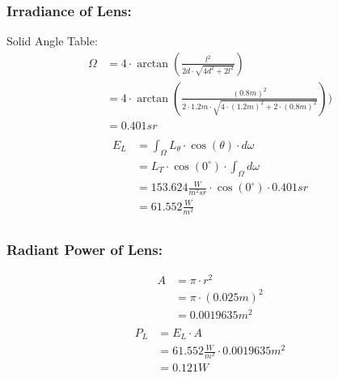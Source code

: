 \documentclass{article}
\begin{document}
    \subsubsection*{Irradiance of Lens:}
    Solid Angle Table:
    \begin{align*}
        \Omega &= 4 \cdot \arctan \left( \frac{l^2}{2d \cdot \sqrt{4d^2 + 2l^2}} \right) \\
        &= 4 \cdot \arctan \left( \frac{(0.8 m)^2}{2 \cdot 1.2 m \cdot \sqrt{4 \cdot (1.2 m)^2 + 2 \cdot (0.8 m)^2}} \right)) \\
        &= 0.401 sr \\
    \end{align*}
    \begin{align*}
        E_L &= \int_{\Omega} L_{\theta} \cdot \cos(\theta) \cdot d\omega \\
        &= L_T \cdot \cos(0^{\circ}) \cdot \int_{\Omega} d\omega \\
        &= 153.624 \frac{W}{m^2 sr} \cdot \cos(0^\circ) \cdot 0.401 sr \\
        &= 61.552 \frac{W}{m^2} \\
    \end{align*}
    \subsubsection*{Radiant Power of Lens:}
    \begin{align*}
        A &= \pi \cdot r^2 \\
        &= \pi \cdot (0.025 m)^2 \\
        &= 0.0019635 m^2 \\
    \end{align*}
    \begin{align*}
        P_L &= E_L \cdot A \\
        &= 61.552 \frac{W}{m^2} \cdot 0.0019635 m^2 \\
        &= 0.121 W \\
    \end{align*}
\end{document}
